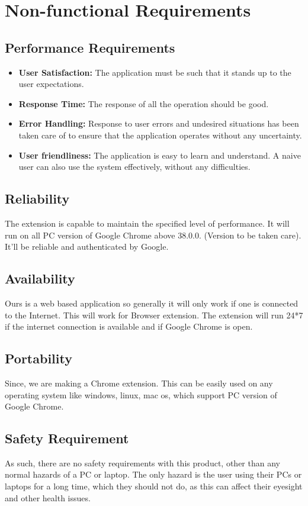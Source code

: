 \documentclass[12pt]{article}
\begin{document}
\section{Non-functional Requirements}
\subsection{Performance Requirements}
\begin{itemize}
    \item \textbf{User Satisfaction:} The application must be such
that it stands up to the user expectations.
    \item \textbf{Response Time:} The response of all the operation
should be good.
    \item \textbf{Error Handling:} Response to user errors and
undesired situations has been taken care of to
ensure that the application operates without any
uncertainty.
    \item \textbf{User friendliness: }The application is easy to learn
and understand. A naive user can also use the system effectively,
without any difficulties.
\end{itemize}

\subsection{Reliability}
The extension is capable to maintain the specified level of
performance. It will run on all PC version of Google Chrome
above 38.0.0. (Version to be taken care). It’ll be reliable and authenticated by Google.

\subsection{Availability}
Ours is a web based application so generally it will only work if one is connected to the Internet. This will work for Browser extension. The extension will run 24*7 if the internet connection is
available and if Google Chrome is open.

\subsection{Portability}
Since, we are making a Chrome extension. This can be easily used on any operating system like windows, linux, mac os, which support PC version of Google Chrome.

\subsection{Safety Requirement}
As such, there are no safety requirements with this
product, other than any normal hazards of a PC or laptop.
The only hazard is the user using their PCs or laptops for a
long time, which they should not do, as this can affect their
eyesight and other health issues.
\end{document}
